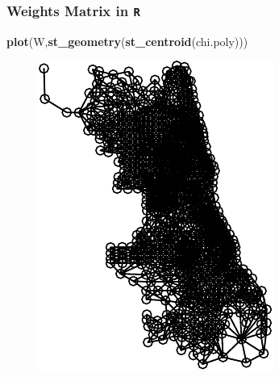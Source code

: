 \documentclass[
  shownotes,
  xcolor={svgnames},
  hyperref={colorlinks,citecolor=DarkBlue,linkcolor=DarkRed,urlcolor=DarkBlue}
  ]{beamer}
\newenvironment{Shaded}{\begin{snugshade}}{\end{snugshade}}
\newcommand{\KeywordTok}[1]{\textcolor[rgb]{0.13,0.29,0.53}{\textbf{#1}}}
\newcommand{\NormalTok}[1]{#1}
\begin{document}
\begin{frame}[fragile]
\frametitle{Weights Matrix in \texttt{R}}


\begin{scriptsize}
\begin{Shaded}
\begin{Highlighting}[]
\KeywordTok{plot}\NormalTok{(W,}\KeywordTok{st\_geometry}\NormalTok{(}\KeywordTok{st\_centroid}\NormalTok{(chi.poly)))}
\end{Highlighting}
\end{Shaded}
\end{scriptsize}


 \begin{figure}[H] \centering
    \captionsetup{justification=centering}
    \includegraphics[scale=0.7]{Example_12_files/figure-latex/neighbors_plot-1.pdf}
   \end{figure}


\end{frame}
\end{document}
